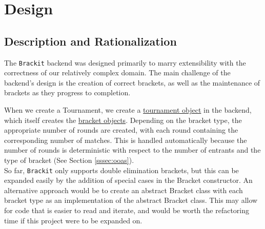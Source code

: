 \documentclass{article}
\begin{document}
\section{Design}
\subsection{Description and Rationalization}
The \texttt{Brackit} backend was designed primarily to marry extensibility with the correctness of 
our relatively complex domain. The main challenge of the backend's design is the creation of 
correct brackets, as well as the maintenance of brackets as they progress to completion.

When we create a Tournament, we create a \href{https://github.com/alextrosta/brackit/blob/master/backend/tournament.py#L18}{tournament object} in the backend, which itself creates
the \href{https://github.com/alextrosta/brackit/blob/master/backend/tournament.py#L59}{bracket objects}. Depending on the bracket type, the appropriate number of rounds are created, 
with each round containing the corresponding number of matches. This is handled automatically because
the number of rounds is deterministic with respect to the number of entrants and the type of bracket (See Section \ref{sssec:ooas}).\\
So far, \texttt{Brackit} only supports double elimination brackets, but this can be expanded easily by the addition of special cases in the Bracket constructor. An alternative approach would be to create an abstract Bracket
class with each bracket type as an implementation of the abstract Bracket class. This may allow for 
code that is easier to read and iterate, and would be worth the refactoring time if this project were 
to be expanded on. 
\end{document}
